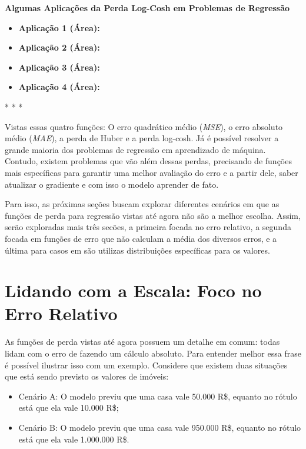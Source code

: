 \textbf{Algumas Aplicações da Perda Log-Cosh em Problemas de Regressão} 
\vspace{1em}

\begin{itemize}
    \item \textbf{Aplicação 1 (Área):}
    \item \textbf{Aplicação 2 (Área):}
    \item \textbf{Aplicação 3 (Área):}
    \item \textbf{Aplicação 4 (Área):}
\end{itemize}

\medskip
\begin{center}
 * * *
\end{center}
\medskip

Vistas essas quatro funções: O erro quadrático médio (\textit{MSE}), o erro absoluto médio (\textit{MAE}), a perda de Huber e a perda log-cosh. Já é possível resolver a grande maioria dos problemas de regressão em aprendizado de máquina. Contudo, existem problemas que vão além dessas perdas, precisando de funções mais específicas para garantir uma melhor avaliação do erro e a partir dele, saber atualizar o gradiente e com isso o modelo aprender de fato.

Para isso, as próximas seções buscam explorar diferentes cenários em que as funções de perda para regressão vistas até agora não são a melhor escolha. Assim, serão exploradas mais três secões, a primeira focada no erro relativo, a segunda focada em funções de erro que não calculam a média dos diversos erros, e a última para casos em são utilizas distribuições específicas para os valores.

\section{Lidando com a Escala: Foco no Erro Relativo}

As funções de perda vistas até agora possuem um detalhe em comum: todas lidam com o erro de fazendo um cálculo absoluto. Para entender melhor essa frase é possível ilustrar isso com um exemplo. Considere que existem duas situações que está sendo previsto os valores de imóveis:

\begin{itemize}
    \item Cenário A: O modelo previu que uma casa vale 50.000 R\$, equanto no rótulo está que ela vale 10.000 R\$;
    \item Cenário B: O modelo previu que uma casa vale 950.000 R\$, equanto no rótulo está que ela vale 1.000.000 R\$.
\end{itemize}

